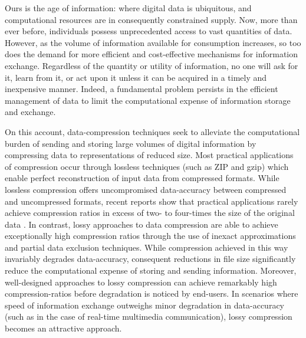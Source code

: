 

\noindent
Ours is the age of information: where digital data is ubiquitous, and computational resources are in consequently constrained supply.
Now, more than ever before, individuals possess unprecedented access to vast quantities of data. 
However, as the volume of information available for consumption increases, so too does the demand for more efficient and cost-effective mechanisms for information exchange. 
Regardless of the quantity or utility of information, no one will ask for it, learn from it, or act upon it unless it can be acquired in a timely and inexpensive manner. 
Indeed, a fundamental problem persists in the efficient management of data to limit the computational expense of information storage and exchange.

On this account, data-compression techniques seek to alleviate the computational burden of sending and storing large volumes of digital information by compressing data to representations of reduced size.
Most practical applications of compression occur through lossless techniques (such as ZIP and gzip) which enable perfect reconstruction of input data from compressed formats.
While lossless compression offers uncompromised data-accuracy between compressed and uncompressed formats, recent reports show that practical applications rarely achieve compression ratios in excess of two- to four-times the size of the original data \cite{mittal2015survey}.
In contrast, lossy approaches to data compression are able to achieve exceptionally high compression ratios through the use of inexact approximations and partial data exclusion techniques.
While compression achieved in this way invariably degrades data-accuracy, consequent reductions in file size significantly reduce the computational expense of storing and sending information. 
Moreover, well-designed approaches to lossy compression can achieve remarkably high compression-ratios before degradation is noticed by end-users.
In scenarios where speed of information exchange outweighs minor degradation in data-accuracy (such as in the case of real-time multimedia communication), lossy compression becomes an attractive approach. 

